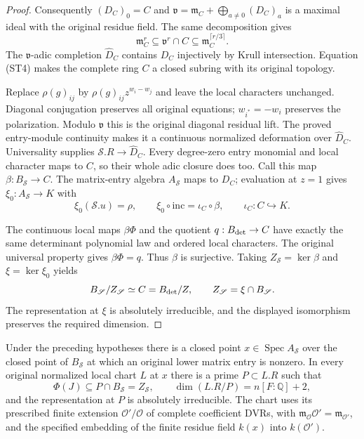 \begin{proof}
Consequently $(D_C)_0=C$ and
$\mathfrak v=\mathfrak m_C+\bigoplus_{a\ne0}(D_C)_a$ is a
maximal ideal with the original residue field. The same decomposition
gives
\[
 \mathfrak m_C^r\subseteq\mathfrak v^r\cap C
       \subseteq\mathfrak m_C^{\lceil r/3\rceil}.       \tag{ST4}
\]
The $\mathfrak v$-adic completion $\widehat D_C$ contains $D_C$
injectively by Krull intersection. Equation (ST4) makes the complete
ring $C$ a closed subring with its original topology.

Replace $\rho(g)_{ij}$ by $\rho(g)_{ij}z^{w_i-w_j}$ and leave
the local characters unchanged. Diagonal conjugation preserves
all original equations; $w_{i^*}=-w_i$ preserves the polarization.
Modulo $\mathfrak v$ this is the original diagonal residual lift.
The proved entry-module continuity makes it a continuous normalized
deformation over $\widehat D_C$. Universality supplies
$\mathscr S.R\to\widehat D_C$. Every degree-zero entry monomial
and local character maps to $C$, so their whole adic closure does too.
Call this map $\beta:B_{\mathscr S}\to C$. The matrix-entry algebra
$A_{\mathscr S}$ maps to $D_C$; evaluation at $z=1$ gives
$\xi_0:A_{\mathscr S}\to K$ with
\[
 \xi_0(\mathscr S.u)=\rho,
 \qquad \xi_0\circ\mathrm{inc}=\iota_C\circ\beta,
 \qquad \iota_C:C\hookrightarrow K.
\]

The continuous local maps $\beta\Phi$ and the quotient
$q:B_{\rm det}\to C$ have exactly the same determinant polynomial
law and ordered local characters. The original universal property
gives $\beta\Phi=q$. Thus $\beta$ is surjective. Taking
$Z_{\mathscr S}=\ker\beta$ and $\xi=\ker\xi_0$ yields
\[
 B_{\mathscr S}/Z_{\mathscr S}\simeq C=B_{\rm det}/Z,
 \qquad Z_{\mathscr S}=\xi\cap B_{\mathscr S}.
\]
The representation at $\xi$ is absolutely irreducible, and the
displayed isomorphism preserves the required dimension.
\end{proof}

\begin{theorem}\label{thm:selmer-support-starting-chart}
Under the preceding hypotheses there is a closed point
$x\in\operatorname{Spec}A_{\mathscr S}$ over the closed point of
$B_{\mathscr S}$ at which an original lower matrix entry is nonzero.
In every original normalized local chart $L$ at $x$ there is a prime
$P\subset L.R$ such that
\[
 \Phi(J)\subseteq P\cap B_{\mathscr S}=Z_{\mathscr S},\qquad
 \dim(L.R/P)=n[F:\mathbb Q]+2,
\]
and the representation at $P$ is absolutely irreducible. The chart
uses its prescribed finite extension $\mathcal O'/\mathcal O$ of
complete coefficient DVRs, with
$\mathfrak m_{\mathcal O}\mathcal O'=\mathfrak m_{\mathcal O'}$,
and the specified embedding of the finite residue field $k(x)$ into
$k(\mathcal O')$.
\end{theorem}

